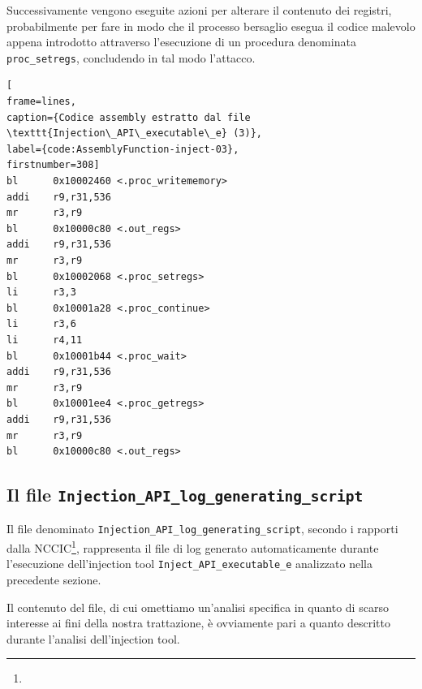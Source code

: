 \documentclass[10pt,a4paper, titlepage]{report}
\begin{document}
Successivamente vengono eseguite azioni per alterare il contenuto dei registri, probabilmente per fare in modo che il processo bersaglio esegua il codice malevolo appena introdotto attraverso l'esecuzione di un procedura denominata \texttt{proc\_setregs}, concludendo in tal modo l'attacco.

\begin{lstlisting}[
frame=lines, 
caption={Codice assembly estratto dal file \texttt{Injection\_API\_executable\_e} (3)}, 
label={code:AssemblyFunction-inject-03},
firstnumber=308]
bl      0x10002460 <.proc_writememory>
addi    r9,r31,536
mr      r3,r9
bl      0x10000c80 <.out_regs>
addi    r9,r31,536
mr      r3,r9
bl      0x10002068 <.proc_setregs>
li      r3,3
bl      0x10001a28 <.proc_continue>
li      r3,6
li      r4,11
bl      0x10001b44 <.proc_wait>
addi    r9,r31,536
mr      r3,r9
bl      0x10001ee4 <.proc_getregs>
addi    r9,r31,536
mr      r3,r9
bl      0x10000c80 <.out_regs>
\end{lstlisting}

\newpage
\subsection{Il file \texttt{Injection\_API\_log\_generating\_script}}\label{sec:apilog}

Il file denominato \texttt{Injection\_API\_log\_generating\_script}, secondo i rapporti dalla NCCIC\footnote{}, rappresenta il file di log generato automaticamente durante l'esecuzione dell'injection tool \texttt{Inject\_API\_executable\_e} analizzato nella precedente sezione.

Il contenuto del file, di cui omettiamo un'analisi specifica in quanto di scarso interesse ai fini della nostra trattazione, è ovviamente pari a quanto descritto durante l'analisi dell'injection tool.
\end{document}
